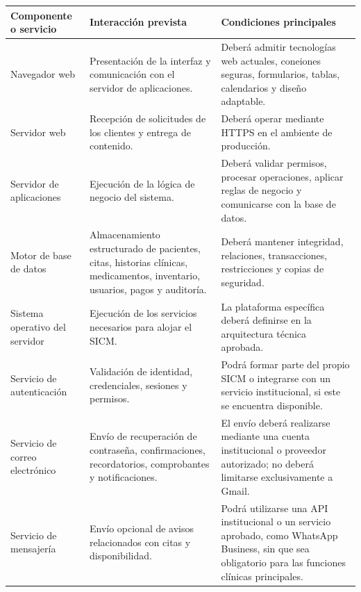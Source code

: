\documentclass[11pt,a4paper]{article}
\begin{document}
	\begin{longtable}{p{} p{} p{}}
		
		
		\toprule
		\textbf{Componente o servicio} &
		\textbf{Interacción prevista} &
		\textbf{Condiciones principales} \\
		\midrule
		\endhead
		
		\bottomrule
		\endlastfoot
		
		Navegador web &
		Presentación de la interfaz y comunicación con el servidor de aplicaciones. &
		Deberá admitir tecnologías web actuales, coneiones seguras, formularios,
		tablas, calendarios y diseño adaptable. \\
		
		Servidor web &
		Recepción de solicitudes de los clientes y entrega de contenido. &
		Deberá operar mediante HTTPS en el ambiente de producción. \\
		
		Servidor de aplicaciones &
		Ejecución de la lógica de negocio del sistema. &
		Deberá validar permisos, procesar operaciones, aplicar reglas de negocio y
		comunicarse con la base de datos. \\
		
		Motor de base de datos &
		Almacenamiento estructurado de pacientes, citas, historias clínicas,
		medicamentos, inventario, usuarios, pagos y auditoría. &
		Deberá mantener integridad, relaciones, transacciones, restricciones y copias de
		seguridad. \\
		
		Sistema operativo del servidor &
		Ejecución de los servicios necesarios para alojar el SICM. &
		La plataforma específica deberá definirse en la arquitectura técnica aprobada. \\
		
		Servicio de autenticación &
		Validación de identidad, credenciales, sesiones y permisos. &
		Podrá formar parte del propio SICM o integrarse con un servicio institucional,
		si este se encuentra disponible. \\
		
		Servicio de correo electrónico &
		Envío de recuperación de contraseña, confirmaciones, recordatorios,
		comprobantes y notificaciones. &
		El envío deberá realizarse mediante una cuenta institucional o proveedor
		autorizado; no deberá limitarse exclusivamente a Gmail. \\
		
		Servicio de mensajería &
		Envío opcional de avisos relacionados con citas y disponibilidad. &
		Podrá utilizarse una API institucional o un servicio aprobado, como WhatsApp
		Business, sin que sea obligatorio para las funciones clínicas principales. \\
		

\end{longtable}
\end{document}
